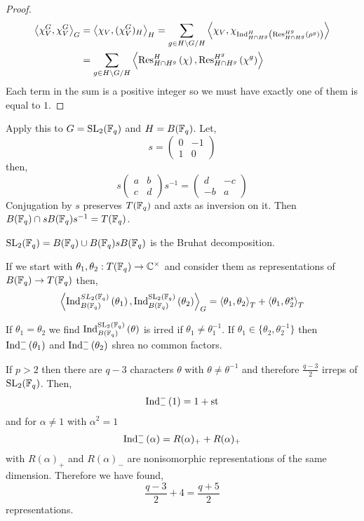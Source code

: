 \documentclass[12pt]{article}
\begin{document}
\begin{proof}
\begin{align*}
\left< \chi_V^G, \chi_V^G \right>_G & = \left< \chi_V, (\chi_V^G)_H \right>_H = \sum_{g \in H \backslash G / H} \left< \chi_V, \chi_{\mathrm{Ind}^{H}_{H \cap H^g} \left( \mathrm{Res}^{H^g}_{H \cap H^g} \left( \rho^g \right) \right)} \right> 
\\
& = \sum_{g \in H \backslash G / H}\left< \mathrm{Res}^{H}_{H \cap H^g} \left( \chi \right), \mathrm{Res}^{H^g}_{H \cap H^g} \left( \chi^g \right) \right>
\end{align*}
Each term in the sum is a positive integer so we must have exactly one of them is equal to $1$. 
\end{proof}

\begin{example}
Apply this to $G = \mathrm{SL}_2(\mathbb{F}_q)$ and $H = B(\mathbb{F}_q)$. Let,
\[ s = \begin{pmatrix}
0 & - 1
\\
1 & 0
\end{pmatrix} \]
then,
\[ s 
\begin{pmatrix}
a & b
\\
c & d
\end{pmatrix}
s^{-1} = 
\begin{pmatrix}
d & -c
\\
-b & a
\end{pmatrix} \]
Conjugation by $s$ preserves $T(\mathbb{F}_q)$ and axts as inversion on it. Then $B(\mathbb{F}_q) \cap s B(\mathbb{F}_q) s^{-1} = T(\mathbb{F}_q)$. 
\end{example}

\begin{lemma}
$\mathrm{SL}_2(\mathbb{F}_q) = B(\mathbb{F}_q) \cup B(\mathbb{F}_q) s B(\mathbb{F}_q)$ is the Bruhat decomposition. 
\end{lemma}

If we start with $\theta_1, \theta_2 : T(\mathbb{F}_q) \to \mathbb{C}^\times$ and consider them as representations of $B(\mathbb{F}_q) \to T(\mathbb{F}_q)$ then,
\[ \left< \mathrm{Ind}^{SL_2(\mathbb{F}_q)}_{B(\mathbb{F}_q)} \left( \theta_1 \right), \mathrm{Ind}^{\mathrm{SL}_2(\mathbb{F}_q)}_{B(\mathbb{F}_q)} \left( \theta_2 \right) \right>_G = \left< \theta_1, \theta_2 \right>_T + \left< \theta_1, \theta_2^s \right>_T \]

\begin{cor}
If $\theta_1 = \theta_2$ we find $\mathrm{Ind}^{\mathrm{SL}_2(\mathbb{F}_q)}_{B(\mathbb{F}_q)} \left( \theta \right)$ is irred if $\theta_1 \neq \theta_1^{-1}$. If $\theta_1 \in \{ \theta_2, \theta_2^{-1} \}$ then $\mathrm{Ind}^{-}_{-} \left( \theta_1 \right)$ and $\mathrm{Ind}^{-}_{-} \left( \theta_2 \right)$ shrea no common factors. 
\end{cor}

If $p > 2$ then there are $q - 3$ characters $\theta$ with $\theta \neq \theta^{-1}$ and therefore $\frac{q-3}{2}$ irreps of $\mathrm{SL}_2(\mathbb{F}_q)$. Then,
\[ \mathrm{Ind}^{-}_{-} \left( 1 \right) = 1 + \text{st} \]
and for $\alpha \neq 1$ with $\alpha^2 = 1$
\[ \mathrm{Ind}^{-}_{-} \left( \alpha \right) = R(\alpha)_+ + R(\alpha)_+ \]
with $R(\alpha)_+$ and $R(\alpha)_-$ are nonisomorphic representations of the same dimension. Therefore we have found,
\[ \frac{q - 3}{2} + 4 = \frac{q + 5}{2} \]
representations.
\end{document}
